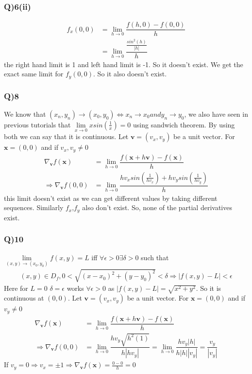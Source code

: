 \documentclass[11pt]{beamer}
\begin{document}
\begin{frame}
\frametitle{Q)6(ii)}
\begin{align*}
f_x(0,0)&=\underset{h\to0}{\lim}\dfrac{f(h,0)-f(0,0)}{h}\\
&=\underset{h\to0}{\lim}\dfrac{\frac{sin^2(h)}{|h|}}{h}
\end{align*}
the right hand limit is 1 and left hand limit is -1. So it doesn't exist. We get the exact same limit for $f_y(0,0)$. So it also doesn't exist.
\end{frame}
\begin{frame}
\frametitle{Q)8}
We know that $(x_n,y_n)\to(x_0,y_0)\Leftrightarrow x_n\to x_0 and y_n\to y_0 $, we also have seen in previous tutorials that $\underset{x\to 0}{\lim}xsin(\frac{1}{x})=0$ using sandwich theorem. By using both we can say that it is continuous. Let $\textbf{v}=(v_x,v_y)$ be a unit vector. For $\textbf{x}=(0,0)$ and if $v_x,v_y\neq 0$
\begin{align*}
\nabla_{\textbf{v}}f(\textbf{x})&=\underset{h\to0}{\lim}\dfrac{f(\textbf{x}+h\textbf{v})-f(\textbf{x})}{h}\\
\Rightarrow \nabla_{\textbf{v}}f(0,0)&=\underset{h\to 0}{\lim}\dfrac{hv_xsin(\frac{1}{hv_x})+hv_ysin(\frac{1}{hv_y})}{h}
\end{align*}
this limit doesn't exist as we can get different values by taking different sequences. Similarly $f_x$,$f_y$ also don't exist. So, none of the partial derivatives exist.
\end{frame}
\begin{frame}
\frametitle{Q)10}
$\underset{(x,y)\to(x_0,y_0)}{\lim} f(x,y)=L$ iff $\forall \epsilon>0 \exists \delta >0$ such that
\begin{align*}
(x,y)\in D_f,0<\sqrt{(x-x_0)^2+(y-y_0)^2}<\delta\Rightarrow |f(x,y)-L|<\epsilon
\end{align*}
Here for $L=0$ $\delta=\epsilon$ works $\forall \epsilon>0$ as $|f(x,y)-L|=\sqrt{x^2+y^2}$. So it is continuous at $(0,0)$. Let $\textbf{v}=(v_x,v_y)$ be a unit vector. For $\textbf{x}=(0,0)$ and if $v_y\neq 0$
\begin{align*}
\nabla_{\textbf{v}}f(\textbf{x})&=\underset{h\to0}{\lim}\dfrac{f(\textbf{x}+h\textbf{v})-f(\textbf{x})}{h}\\
\Rightarrow \nabla_{\textbf{v}}f(0,0)&=\underset{h\to 0}{\lim}\dfrac{hv_y\sqrt{h^2(1)}}{h|hv_y|}=\underset{h\to 0}{\lim}\dfrac{hv_y|h|}{h|h||v_y|}=\dfrac{v_y}{|v_y|}
\end{align*}
If $v_y=0 \Rightarrow v_x=\pm 1\Rightarrow\nabla_{\textbf{v}}f(\textbf{x})=\frac{0-0}{h}=0$
\end{frame}
\end{document}

